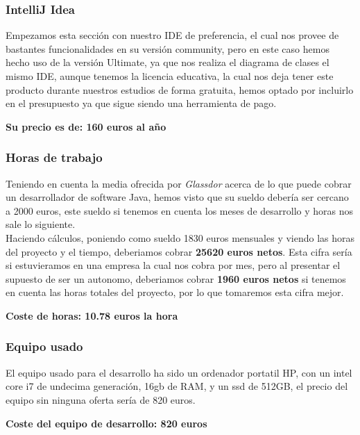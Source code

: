\documentclass[a4paper]{article}
\begin{document}
\subsubsection{IntelliJ Idea}
Empezamos esta sección con nuestro IDE de preferencia, el cual nos provee de bastantes funcionalidades en su versión community, pero en este caso hemos hecho uso de la versión Ultimate, ya que nos realiza el diagrama de clases el mismo IDE, aunque tenemos la licencia educativa, la cual nos deja tener este producto durante nuestros estudios de forma gratuita, hemos optado por incluirlo en el presupuesto ya que sigue siendo una herramienta de pago. \\
\begin{flushright}
    \bf Su precio es de: 160 euros al año
\end{flushright}

\subsubsection{Horas de trabajo}
Teniendo en cuenta la media ofrecida por \textit{Glassdor} acerca de lo que puede cobrar un desarrollador de software Java, hemos visto que su sueldo debería ser cercano a 2000 euros, este sueldo si tenemos en cuenta los meses de desarrollo y horas nos sale lo siguiente.\\
Haciendo cálculos, poniendo como sueldo 1830 euros mensuales y viendo las horas del proyecto y el tiempo, deberiamos cobrar \textbf{25620 euros netos}. Esta cifra sería si estuvieramos en una empresa la cual nos cobra por mes, pero al presentar el supuesto de ser un autonomo, deberiamos cobrar \textbf{1960 euros netos} si tenemos en cuenta las horas totales del proyecto, por lo que tomaremos esta cifra mejor.
\begin{flushright}
    \bf Coste de horas: 10.78 euros la hora
\end{flushright}

\subsubsection{Equipo usado}
El equipo usado para el desarrollo ha sido un ordenador portatil HP, con un intel core i7 de undecima generación, 16gb de RAM, y un ssd de 512GB, el precio del equipo sin ninguna oferta sería de 820 euros.
\begin{flushright}
    \bf Coste del equipo de desarrollo: 820 euros
\end{flushright}
\end{document}
